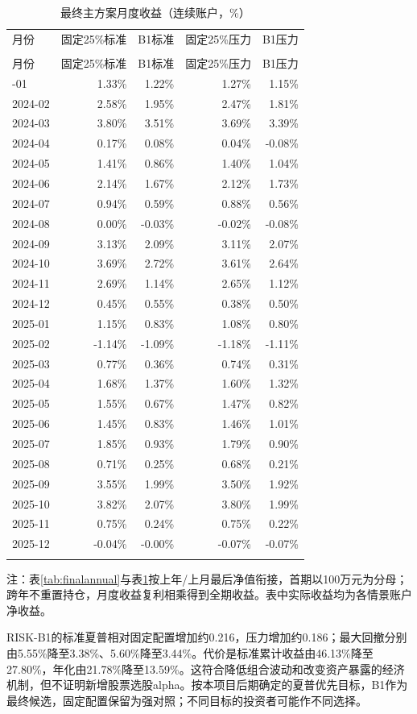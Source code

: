 \documentclass[12pt]{article}
\newcommand{\toprule}{\noalign{\hrule height .8pt}}
\newcommand{\midrule}{\noalign{\hrule height .4pt}}
\newcommand{\bottomrule}{\noalign{\hrule height .8pt}}
\begin{document}
{\small
\begin{longtable}{@{}lrrrr@{}}
\caption{最终主方案月度收益（连续账户，\%）}\label{tab:finalmonthly}\\
\toprule
月份 & 固定25\%标准 & B1标准 & 固定25\%压力 & B1压力 \\
\midrule\endfirsthead
\multicolumn{5}{c}{表\thetable（续）}\\\toprule
月份 & 固定25\%标准 & B1标准 & 固定25\%压力 & B1压力 \\
\midrule\endhead
2024-01 & 1.33\% & 1.22\% & 1.27\% & 1.15\% \\
2024-02 & 2.58\% & 1.95\% & 2.47\% & 1.81\% \\
2024-03 & 3.80\% & 3.51\% & 3.69\% & 3.39\% \\
2024-04 & 0.17\% & 0.08\% & 0.04\% & -0.08\% \\
2024-05 & 1.41\% & 0.86\% & 1.40\% & 1.04\% \\
2024-06 & 2.14\% & 1.67\% & 2.12\% & 1.73\% \\
2024-07 & 0.94\% & 0.59\% & 0.88\% & 0.56\% \\
2024-08 & 0.00\% & -0.03\% & -0.02\% & -0.08\% \\
2024-09 & 3.13\% & 2.09\% & 3.11\% & 2.07\% \\
2024-10 & 3.69\% & 2.72\% & 3.61\% & 2.64\% \\
2024-11 & 2.69\% & 1.14\% & 2.65\% & 1.12\% \\
2024-12 & 0.45\% & 0.55\% & 0.38\% & 0.50\% \\
2025-01 & 1.15\% & 0.83\% & 1.08\% & 0.80\% \\
2025-02 & -1.14\% & -1.09\% & -1.18\% & -1.11\% \\
2025-03 & 0.77\% & 0.36\% & 0.74\% & 0.31\% \\
2025-04 & 1.68\% & 1.37\% & 1.60\% & 1.32\% \\
2025-05 & 1.55\% & 0.67\% & 1.47\% & 0.82\% \\
2025-06 & 1.45\% & 0.83\% & 1.46\% & 1.01\% \\
2025-07 & 1.85\% & 0.93\% & 1.79\% & 0.90\% \\
2025-08 & 0.71\% & 0.25\% & 0.68\% & 0.21\% \\
2025-09 & 3.55\% & 1.99\% & 3.50\% & 1.92\% \\
2025-10 & 3.82\% & 2.07\% & 3.80\% & 1.99\% \\
2025-11 & 0.75\% & 0.24\% & 0.75\% & 0.22\% \\
2025-12 & -0.04\% & -0.00\% & -0.07\% & -0.07\% \\
\bottomrule\end{longtable}}
{\footnotesize\noindent 注：表\ref{tab:finalannual}与表\ref{tab:finalmonthly}按上年/上月最后净值衔接，首期以100万元为分母；跨年不重置持仓，月度收益复利相乘得到全期收益。表中实际收益均为各情景账户净收益。\par}
RISK-B1的标准夏普相对固定配置增加约0.216，压力增加约0.186；最大回撤分别由5.55\%降至3.38\%、5.60\%降至3.44\%。代价是标准累计收益由46.13\%降至27.80\%，年化由21.78\%降至13.59\%。这符合降低组合波动和改变资产暴露的经济机制，但不证明新增股票选股alpha。按本项目后期确定的夏普优先目标，B1作为最终候选，固定配置保留为强对照；不同目标的投资者可能作不同选择。
\end{document}
